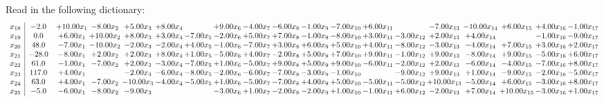 \documentclass[9pt]{article}
\begin{document}
Read in the following dictionary:
\[\begin{array}{c| c c@{\hskip 2pt} c@{\hskip 2pt} c@{\hskip 2pt} c@{\hskip 2pt} c@{\hskip 2pt} c@{\hskip 2pt} c@{\hskip 2pt} c@{\hskip 2pt} c@{\hskip 2pt} c@{\hskip 2pt} c@{\hskip 2pt} c@{\hskip 2pt} c@{\hskip 2pt} c@{\hskip 2pt} c@{\hskip 2pt} c@{\hskip 2pt} c@{\hskip 2pt} }
 x_{18}   &  -2.0 & + 10.00 x_{1} & -8.00 x_{2} & +  5.00 x_{3} & +  8.00 x_{4} &   & +  9.00 x_{6} & -4.00 x_{7} & -6.00 x_{8} & -1.00 x_{9} & -7.00 x_{10} & +  6.00 x_{11} &   & -7.00 x_{13} & -10.00 x_{14} & +  6.00 x_{15} & +  4.00 x_{16} & -1.00 x_{17}\\
 x_{19}   &  0.0 & +  6.00 x_{1} & + 10.00 x_{2} & +  8.00 x_{3} & +  3.00 x_{4} & -7.00 x_{5} & -2.00 x_{6} & +  5.00 x_{7} & +  7.00 x_{8} & -1.00 x_{9} & -8.00 x_{10} & +  3.00 x_{11} & -3.00 x_{12} & +  2.00 x_{13} & +  4.00 x_{14} &   & -1.00 x_{16} & -9.00 x_{17}\\
 x_{20}   &  48.0 & -7.00 x_{1} & -10.00 x_{2} & -2.00 x_{3} & -2.00 x_{4} & +  4.00 x_{5} & -1.00 x_{6} & -7.00 x_{7} & +  3.00 x_{8} & +  6.00 x_{9} & +  5.00 x_{10} & +  4.00 x_{11} & -8.00 x_{12} & -3.00 x_{13} & -4.00 x_{14} & +  7.00 x_{15} & +  3.00 x_{16} & +  2.00 x_{17}\\
 x_{21}   &  -28.0 & -8.00 x_{1} & +  2.00 x_{2} & +  2.00 x_{3} & +  8.00 x_{4} & +  1.00 x_{5} & -5.00 x_{6} & +  4.00 x_{7} & -2.00 x_{8} & +  5.00 x_{9} & +  7.00 x_{10} & +  9.00 x_{11} & -1.00 x_{12} & +  9.00 x_{13} & -8.00 x_{14} & +  9.00 x_{15} & -5.00 x_{16} & +  6.00 x_{17}\\
 x_{22}   &  61.0 & -1.00 x_{1} & -7.00 x_{2} & +  2.00 x_{3} & -3.00 x_{4} & -7.00 x_{5} & +  1.00 x_{6} & -5.00 x_{7} & +  9.00 x_{8} & +  5.00 x_{9} & +  9.00 x_{10} & -6.00 x_{11} & -2.00 x_{12} & +  2.00 x_{13} & -6.00 x_{14} & -4.00 x_{15} & -7.00 x_{16} & +  8.00 x_{17}\\
 x_{23}   &  117.0 & +  4.00 x_{1} &   & -2.00 x_{3} & -6.00 x_{4} & -8.00 x_{5} & -2.00 x_{6} & -6.00 x_{7} & -7.00 x_{8} & -3.00 x_{9} & -1.00 x_{10} &   & -9.00 x_{12} & +  9.00 x_{13} & +  1.00 x_{14} & -9.00 x_{15} & -2.00 x_{16} & -5.00 x_{17}\\
 x_{24}   &  63.0 & +  4.00 x_{1} & -7.00 x_{2} & -10.00 x_{3} & -4.00 x_{4} & -5.00 x_{5} & +  1.00 x_{6} & -5.00 x_{7} & -7.00 x_{8} & +  4.00 x_{9} & +  5.00 x_{10} & -5.00 x_{11} & -5.00 x_{12} & + 10.00 x_{13} & -5.00 x_{14} & +  6.00 x_{15} & -3.00 x_{16} & +  8.00 x_{17}\\
 x_{25}   &  -5.0 & -6.00 x_{1} & -8.00 x_{2} & -9.00 x_{3} &    &   & -3.00 x_{6} & +  1.00 x_{7} & -2.00 x_{8} & -2.00 x_{9} & +  1.00 x_{10} & -1.00 x_{11} & +  6.00 x_{12} & -2.00 x_{13} & +  7.00 x_{14} & + 10.00 x_{15} & -3.00 x_{16} & +  1.00 x_{17}\\

\end{array}\]
\end{document}
